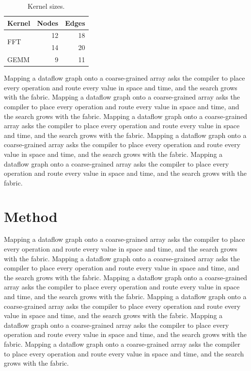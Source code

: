 \documentclass[twocolumn]{article}
\begin{document}
\begin{table}[h]
  \centering
  \caption{Kernel sizes.}
  \label{tab:small}
  \begin{tabular}{lrr}
    \hline
    Kernel & Nodes & Edges \\
    \hline
    \multirow{2}{*}{FFT} & 12 & 18 \\
     & 14 & 20 \\
    GEMM & 9 & 11 \\
    \hline
  \end{tabular}
\end{table}

Mapping a dataflow graph onto a coarse-grained array asks the compiler to place every operation and route every value in space and time, and the search grows with the fabric. Mapping a dataflow graph onto a coarse-grained array asks the compiler to place every operation and route every value in space and time, and the search grows with the fabric. Mapping a dataflow graph onto a coarse-grained array asks the compiler to place every operation and route every value in space and time, and the search grows with the fabric. Mapping a dataflow graph onto a coarse-grained array asks the compiler to place every operation and route every value in space and time, and the search grows with the fabric. Mapping a dataflow graph onto a coarse-grained array asks the compiler to place every operation and route every value in space and time, and the search grows with the fabric.

\section{Method}
Mapping a dataflow graph onto a coarse-grained array asks the compiler to place every operation and route every value in space and time, and the search grows with the fabric. Mapping a dataflow graph onto a coarse-grained array asks the compiler to place every operation and route every value in space and time, and the search grows with the fabric. Mapping a dataflow graph onto a coarse-grained array asks the compiler to place every operation and route every value in space and time, and the search grows with the fabric. Mapping a dataflow graph onto a coarse-grained array asks the compiler to place every operation and route every value in space and time, and the search grows with the fabric. Mapping a dataflow graph onto a coarse-grained array asks the compiler to place every operation and route every value in space and time, and the search grows with the fabric. Mapping a dataflow graph onto a coarse-grained array asks the compiler to place every operation and route every value in space and time, and the search grows with the fabric.
\end{document}
